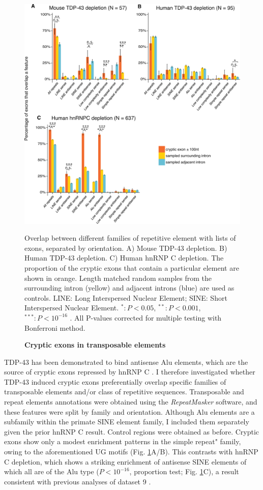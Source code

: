 \begin{figure}[h!]
	\centering
	\includegraphics[width=\textwidth]{Figures/03_cryptic_exons/Figure_3_repeat_elements.png}
	\caption{\textbf{Cryptic exons in transposable elements}}
	Overlap between different families of repetitive element with lists of exons, separated by orientation. A) Mouse TDP-43 depletion. B) Human TDP-43 depletion. C) Human hnRNP C depletion. The proportion of the cryptic exons that contain a particular element are shown in orange. Length matched random samples from the surrounding intron (yellow) and adjacent introns (blue) are used as controls. LINE: Long Interspersed Nuclear Element; SINE: Short Interspersed Nuclear Element.  $^*: P < 0.05$, $^{**}: P < 0.001$, $^{***}: P < 10^{-16}$ . All P-values corrected for multiple testing with Bonferroni method.
	\label{fig:cryptic_repeats}
\end{figure}

TDP-43 has been demonstrated to bind antisense Alu elements, which are the source of cryptic exons repressed by hnRNP C \citep{Zarnack2013-nv,Kelley2014-sr}. I therefore investigated whether TDP-43 induced cryptic exons preferentially overlap specific families of transposable elements and/or class of repetitive sequences. Transposable and repeat elements annotations were obtained using the \emph{RepeatMasker} software, and these features were split by family and orientation. Although Alu elements are a subfamily within the primate SINE element family, I included them separately given the prior hnRNP C result.
Control regions were obtained as before. Cryptic exons show only a modest enrichment patterns in the simple repeat" family, owing to the aforementioned UG motifs (Fig. \ref{fig:cryptic_repeats}A/B). This contrasts with hnRNP C depletion, which shows a striking enrichment of antisense SINE elements of which all are of the Alu type ($P < 10^{-16}$, proportion test; Fig. \ref{fig:cryptic_repeats}C), a result consistent with previous analyses of dataset 9 \citep{Zarnack2013-nv}.

